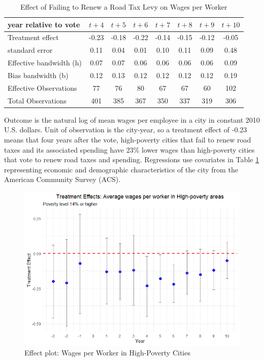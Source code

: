 \begin{table}[ht]
    \centering
    \caption{Effect of Failing to Renew a Road Tax Levy on Wages per Worker}
    \label{tab:wages_per_worker}
    \begin{tabular}{p{2.8cm}ccccccc}
        \hline
        year relative to vote & $t + 4$ & $t + 5$ & $t + 6$ & $t + 7$ & $t + 8$ & $t + 9$ & $t + 10$ \\
        \hline
        Treatment effect & -0.23 & -0.18 & -0.22 & -0.14 & -0.15 & -0.12 & -0.05 \\
        standard error & 0.11 & 0.04 & 0.01 & 0.10 & 0.11 & 0.09 & 0.48 \\
        Effective bandwidth (h) & 0.07 & 0.07 & 0.06 & 0.06 & 0.06 & 0.06 & 0.09 \\
        Bias bandwidth (b) & 0.12 & 0.13 & 0.12 & 0.12 & 0.12 & 0.12 & 0.19 \\
        Effective Observations & 77 & 76 & 80 & 67 & 67 & 60 & 102 \\
        Total Observations & 401 & 385 & 367 & 350 & 337 & 319 & 306 \\
        \hline
    \end{tabular}
    \begin{tablenotes}
        \small
        \item Outcome is the natural log of mean wages per employee in a city in constant 2010 U.S. dollars. Unit of observation is the city-year, so a treatment effect of -0.23 means that four years after the vote, high-poverty cities that fail to renew road taxes and its associated spending have 23\% lower wages than high-poverty cities that vote to renew road taxes and spending. Regressions use covariates in Table \ref{tab:wages_per_worker} representing economic and demographic characteristics of the city from the American Community Survey (ACS).
    \end{tablenotes}
\end{table}

\begin{figure}[htbp]
    \centering
    \includegraphics[width=\textwidth,keepaspectratio]{images/tes_wages_per_emp_hp.png}
    \caption{Effect plot: Wages per Worker in High-Poverty Cities}
    \label{fig:tes_g_emp_hp}
\end{figure}

